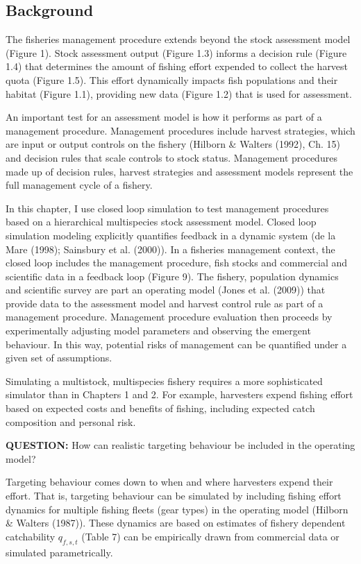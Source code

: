 \documentclass[12pt,]{scrartcl}
\begin{document}
\subsection{Background}\label{background-3}

The fisheries management procedure extends beyond the stock assessment
model (Figure 1). Stock assessment output (Figure 1.3) informs a
decision rule (Figure 1.4) that determines the amount of fishing effort
expended to collect the harvest quota (Figure 1.5). This effort
dynamically impacts fish populations and their habitat (Figure 1.1),
providing new data (Figure 1.2) that is used for assessment.

An important test for an assessment model is how it performs as part of
a management procedure. Management procedures include harvest
strategies, which are input or output controls on the fishery (Hilborn
\& Walters (1992), Ch. 15) and decision rules that scale controls to
stock status. Management procedures made up of decision rules, harvest
strategies and assessment models represent the full management cycle of
a fishery.

In this chapter, I use closed loop simulation to test management
procedures based on a hierarchical multispecies stock assessment model.
Closed loop simulation modeling explicitly quantifies feedback in a
dynamic system (de la Mare (1998); Sainsbury et al. (2000)). In a
fisheries management context, the closed loop includes the management
procedure, fish stocks and commercial and scientific data in a feedback
loop (Figure 9). The fishery, population dynamics and scientific survey
are part an operating model (Jones et al. (2009)) that provide data to
the assessment model and harvest control rule as part of a management
procedure. Management procedure evaluation then proceeds by
experimentally adjusting model parameters and observing the emergent
behaviour. In this way, potential risks of management can be quantified
under a given set of assumptions.

Simulating a multistock, multispecies fishery requires a more
sophisticated simulator than in Chapters 1 and 2. For example,
harvesters expend fishing effort based on expected costs and benefits of
fishing, including expected catch composition and personal risk.

\textbf{QUESTION:} How can realistic targeting behaviour be included in
the operating model?

Targeting behaviour comes down to when and where harvesters expend their
effort. That is, targeting behaviour can be simulated by including
fishing effort dynamics for multiple fishing fleets (gear types) in the
operating model (Hilborn \& Walters (1987)). These dynamics are based on
estimates of fishery dependent catchability \(q_{f,s,t}\) (Table 7) can
be empirically drawn from commercial data or simulated parametrically.
\end{document}
